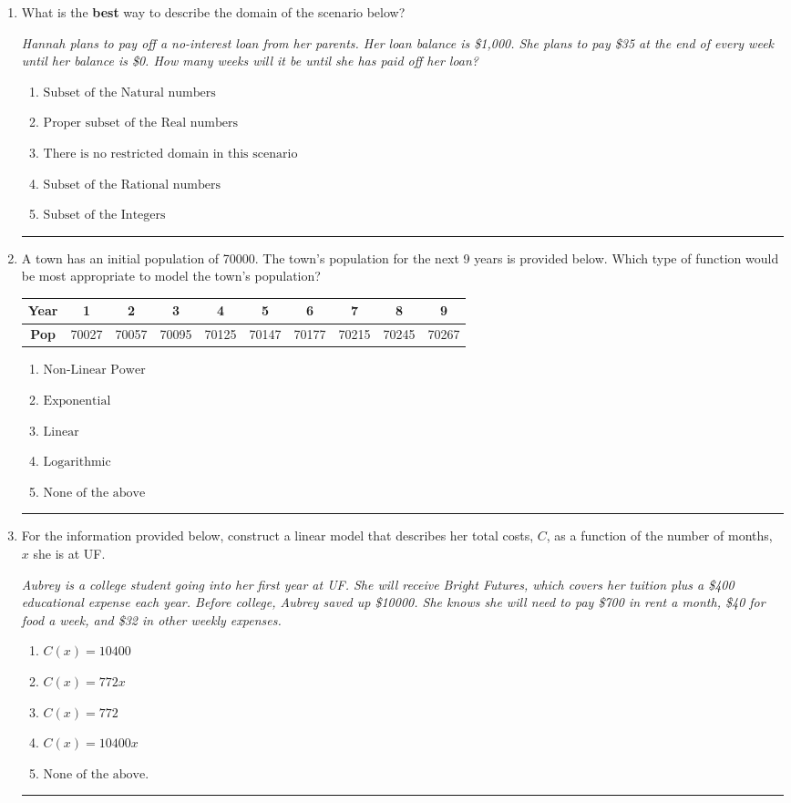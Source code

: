 \documentclass[14pt]{extbook}
\newcommand{\litem}[1]{\item#1\hspace*{-1cm}\rule{\textwidth}{0.4pt}}
\begin{document}
\begin{enumerate}
\litem{
What is the \textbf{best} way to describe the domain of the scenario below?
\begin{center}
    \textit{ Hannah plans to pay off a no-interest loan from her parents. Her loan balance is \$1,000. She plans to pay \$35 at the end of every week until her balance is \$0. How many weeks will it be until she has paid off her loan? }
\end{center}
\begin{enumerate}[label=\Alph*.]
\item \( \text{Subset of the Natural numbers} \)
\item \( \text{Proper subset of the Real numbers} \)
\item \( \text{There is no restricted domain in this scenario} \)
\item \( \text{Subset of the Rational numbers} \)
\item \( \text{Subset of the Integers} \)

\end{enumerate} }
\litem{
A town has an initial population of 70000. The town's population for the next 9 years is provided below. Which type of function would be most appropriate to model the town's population?

\begin{tabular}{c|c|c|c|c|c|c|c|c|c}
\textbf{Year} &1 &2 &3 &4 &5 &6 &7 &8 &9\tabularnewline \hline
\textbf{Pop} &70027 &70057 &70095 &70125 &70147 &70177 &70215 &70245 &70267\end{tabular}\begin{enumerate}[label=\Alph*.]
\item \( \text{Non-Linear Power} \)
\item \( \text{Exponential} \)
\item \( \text{Linear} \)
\item \( \text{Logarithmic} \)
\item \( \text{None of the above} \)

\end{enumerate} }
\litem{
For the information provided below, construct a linear model that describes her total costs, $C$, as a function of the number of months, $x$ she is at UF. 
\begin{center}
    \textit{ Aubrey is a college student going into her first year at UF. She will receive Bright Futures, which covers her tuition plus a \$400 educational expense each year. Before college, Aubrey saved up \$10000. She knows she will need to pay \$700 in rent a month, \$40 for food a week, and \$32 in other weekly expenses. }
\end{center}
\begin{enumerate}[label=\Alph*.]
\item \( C(x) = 10400 \)
\item \( C(x) = 772 x \)
\item \( C(x) = 772 \)
\item \( C(x) = 10400 x \)
\item \( \text{None of the above.} \)


\end{enumerate}}
\end{enumerate}
\end{document}
